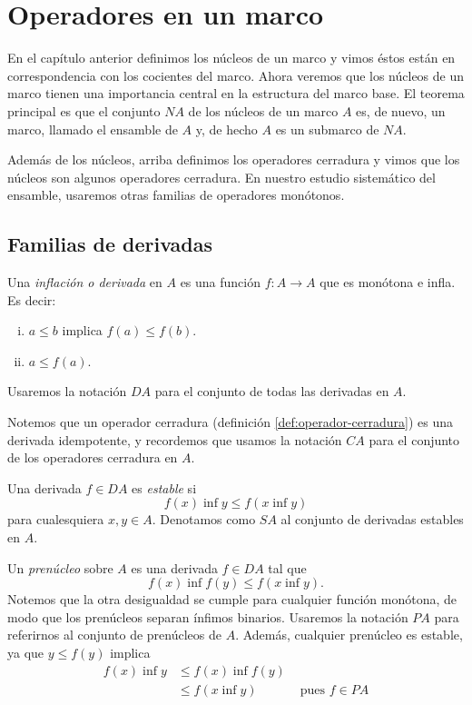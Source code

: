 \chapter{Operadores en un marco}




En el capítulo anterior definimos los núcleos de un marco y vimos
éstos están en correspondencia con los cocientes del marco.
Ahora veremos que los núcleos de un marco tienen una importancia
central en la estructura del marco base.
El teorema principal es que el conjunto $NA$ de los núcleos de un
marco $A$ es, de nuevo, un marco, llamado el
ensamble de $A$ y, de hecho $A$ es un submarco de $NA$.

Además de los núcleos, arriba definimos los operadores cerradura
y vimos que los núcleos son algunos operadores cerradura.
En nuestro estudio sistemático del ensamble, usaremos otras
familias de operadores monótonos.

\section{Familias de derivadas}

\begin{definition}[Derivadas]
  Una \emph{inflación o derivada} en $A$ es una función $f\colon A\to A$ que
  es monótona e infla.
  Es decir:
\begin{enumerate}[(i)]
  \item $a\leq b$ implica $f(a) \leq f(b)$.
  \item $a\leq f(a)$.
  \end{enumerate}
  Usaremos la notación $DA$ para el conjunto de todas las
  derivadas en $A$.
\end{definition}
Notemos que un operador cerradura (definición
\ref{def:operador-cerradura}) es una derivada idempotente, y
recordemos que usamos la notación $CA$ para el conjunto de los 
operadores cerradura en $A$.

\begin{definition}
  Una derivada $f\in DA$ es \emph{estable} si
  \[
    f(x)\inf y \leq f(x\inf y)
  \]
  para cualesquiera $x,y\in A$.
  Denotamos como $SA$ al conjunto de derivadas estables en $A$.
\end{definition}

\begin{definition}[Prenúcleos]
  Un \emph{prenúcleo} sobre $A$ es una derivada $f\in DA$ tal que
  \[
    f(x)\inf f(y) \leq f(x\inf y)
  .\]
  Notemos que la otra desigualdad se cumple para cualquier
  función monótona, de modo que los prenúcleos separan ínfimos
  binarios.
  Usaremos la notación $PA$ para referirnos al conjunto de
  prenúcleos de $A$.
  Además, cualquier prenúcleo es estable, ya que $y\leq f(y)$ implica
  \begin{align*}
    f(x) \inf y
    &\leq f(x) \inf f(y) \\
    &\leq f(x\inf y) & \text{ pues $f\in PA$}
  \end{align*}
\end{definition}

